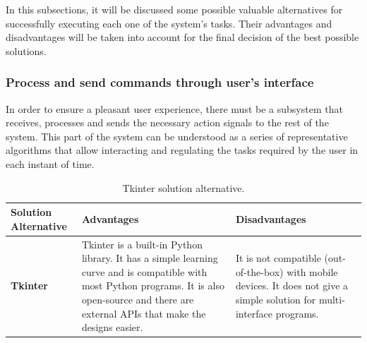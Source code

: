 \documentclass[11pt]{report} %
\begin{document}
In this subsections, it will be discussed some possible valuable alternatives for successfully executing each one of the system's tasks. Their advantages and disadvantages will be taken into account for the final decision of the best possible solutions.\\


\subsubsection{Process and send commands through user's interface}

In order to ensure a pleasant user experience, there must be a subsystem that receives, processes and sends the necessary action signals to the rest of the system. This part of the system can be understood as a series of representative  algorithms that allow interacting and regulating the tasks required by the user in each instant of time.


\begin{table}[H]
\begin{center}
    \begin{tabular}{M{6.6cm}M{3.3cm}M{3.3cm}}
    \hline
    \textbf{Solution Alternative} & \textbf{Advantages} & \textbf{Disadvantages} \\ 
    \hline

    \textbf{Tkinter}
    

    \citep{cite_tkinter_official}
    
    &
    
    Tkinter is a built-in Python library. It has a simple learning curve and is compatible with most Python programs. It is also open-source and there are external APIs that make the designs easier.
    
    &
    
    It is not compatible (out-of-the-box) with mobile devices. It does not give a simple solution for multi-interface programs.
    
    \\ \hline
    \end{tabular}
\caption{\label{tab:tkinter} Tkinter solution alternative.}
\end{center}
\end{table}
\end{document}
